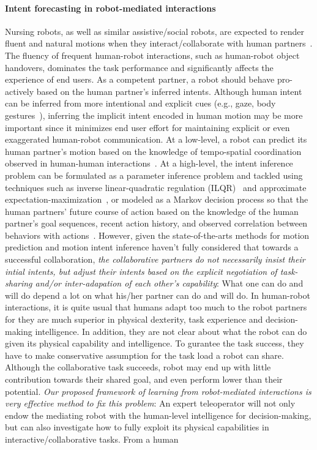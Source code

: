 \documentclass[letterpaper, 11 pt, onecolumn]{article}
\begin{document}
\paragraph*{Intent forecasting in robot-mediated interactions}
Nursing robots, as well as similar assistive/social robots, are expected to render fluent and natural motions when they interact/collaborate with human partners~\cite{calinon2009learning,strabala2013towards}. The fluency of frequent human-robot interactions, such as human-robot object handovers, dominates the task performance and significantly affects the experience of end users. As a competent partner, a robot should behave pro-actively based on the human partner's inferred intents. Although human intent can be inferred from more intentional and explicit cues (e.g., gaze, body gestures~\cite{huang2016anticipatory}), inferring the implicit intent encoded in human motion may be more important since it minimizes end user effort for maintaining explicit or even exaggerated human-robot communication. At a low-level, a robot can predict its human partner's motion based on the knowledge of tempo-spatial coordination observed in human-human interactions~\cite{Hogan_Flash:85, sisbot2012human,huber2010assist, glasauer2010interacting, strabala2013towards, li2015rssworkshop, perez2015fast,maeda2017phase}. At a high-level, the intent inference problem can be formulated as a parameter inference problem and tackled using techniques such as inverse linear-quadratic regulation (ILQR)~\cite{monfort2015intent} and approximate expectation-maximization~\cite{ravichandar2017human}, or modeled as a Markov decision process so that the human partners' future course of action based on the knowledge of the human partner's goal sequences, recent action history, and observed correlation between behaviors with actions~\cite{mcghan2015human}.  However, given the state-of-the-arts methods for motion prediction and motion intent inference haven't fully considered that towards a successful collaboration, \textit{the collaborative partners do not necessarily insist their intial intents, but adjust their intents based on the explicit negotiation of task-sharing and/or inter-adapation of each other's capability}: What one can do and will do depend a lot on what his/her partner can do and will do. In human-robot interactions, it is quite usual that humans adapt too much to the robot partners for they are much superior in physical dexterity, task experience and decision-making intelligence. In addition, they are not clear about what the robot can do given its physical capability and intelligence. To gurantee the task success, they have to make conservative assumption for the task load a robot can share. Although the collaborative task succeeds, robot may end up with little contribution towards their shared goal, and even perform lower than their potential. \textit{Our proposed framework of learning from robot-mediated interactions is very effective method to fix this problem}: An expert teleoperator will not only endow the mediating robot with the human-level intelligence for decision-making, but can also investigate how to fully exploit its physical capabilities in interactive/collaborative tasks. From a human 
\end{document}
